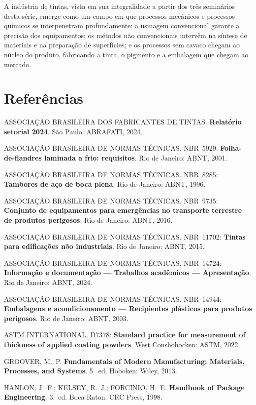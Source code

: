 \documentclass[
  12pt,
  a4paper,
  oneside,
  brazil,
  chapter=TITLE
]{article}
\newcommand{\secbreak}{\clearpage}
\let\oldsection\section
\renewcommand{\section}{\secbreak\oldsection}
\begin{document}
A indústria de tintas, vista em sua integralidade a partir dos três seminários
desta série, emerge como um campo em que processos mecânicos e processos químicos
se interpenetram profundamente: a usinagem convencional garante a precisão dos
equipamentos; os métodos não convencionais intervêm na síntese de materiais e na
preparação de superfícies; e os processos sem cavaco chegam ao núcleo do produto,
fabricando a tinta, o pigmento e a embalagem que chegam ao mercado.

\section{Referências}\label{referencias}

\noindent ASSOCIAÇÃO BRASILEIRA DOS FABRICANTES DE TINTAS.
\textbf{Relatório setorial 2024}. São Paulo: ABRAFATI, 2024.

\noindent ASSOCIAÇÃO BRASILEIRA DE NORMAS TÉCNICAS. NBR~5929:
\textbf{Folha-de-flandres laminada a frio: requisitos}. Rio de Janeiro:
ABNT, 2001.

\noindent ASSOCIAÇÃO BRASILEIRA DE NORMAS TÉCNICAS. NBR~8285:
\textbf{Tambores de aço de boca plena}. Rio de Janeiro: ABNT, 1996.

\noindent ASSOCIAÇÃO BRASILEIRA DE NORMAS TÉCNICAS. NBR~9735:
\textbf{Conjunto de equipamentos para emergências no transporte terrestre de
produtos perigosos}. Rio de Janeiro: ABNT, 2016.

\noindent ASSOCIAÇÃO BRASILEIRA DE NORMAS TÉCNICAS. NBR~11702:
\textbf{Tintas para edificações não industriais}. Rio de Janeiro: ABNT, 2015.

\noindent ASSOCIAÇÃO BRASILEIRA DE NORMAS TÉCNICAS. NBR~14724:
\textbf{Informação e documentação --- Trabalhos acadêmicos --- Apresentação}.
Rio de Janeiro: ABNT, 2024.

\noindent ASSOCIAÇÃO BRASILEIRA DE NORMAS TÉCNICAS. NBR~14944:
\textbf{Embalagens e acondicionamento --- Recipientes plásticos para produtos
perigosos}. Rio de Janeiro: ABNT, 2003.

\noindent ASTM INTERNATIONAL. D7378:
\textbf{Standard practice for measurement of thickness of applied coating
powders}. West Conshohocken: ASTM, 2022.

\noindent GROOVER, M.~P. \textbf{Fundamentals of Modern Manufacturing:
Materials, Processes, and Systems}. 5.~ed. Hoboken: Wiley, 2013.

\noindent HANLON, J.~F.; KELSEY, R.~J.; FORCINIO, H.~E.
\textbf{Handbook of Package Engineering}. 3.~ed. Boca Raton: CRC Press, 1998.
\end{document}
